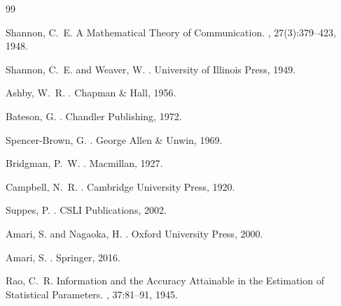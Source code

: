\documentclass[12pt,twoside,openright]{book}
\begin{document}
\backmatter


\begin{thebibliography}{99}


Shannon, C.~E.
\newblock A Mathematical Theory of Communication.
,
  27(3):379--423, 1948.

Shannon, C.~E. and Weaver, W.
.
\newblock University of Illinois Press, 1949.

Ashby, W.~R.
.
\newblock Chapman \& Hall, 1956.

Bateson, G.
.
\newblock Chandler Publishing, 1972.

Spencer-Brown, G.
.
\newblock George Allen \& Unwin, 1969.


Bridgman, P.~W.
.
\newblock Macmillan, 1927.

Campbell, N.~R.
.
\newblock Cambridge University Press, 1920.

Suppes, P.
.
\newblock CSLI Publications, 2002.


Amari, S. and Nagaoka, H.
.
\newblock Oxford University Press, 2000.

Amari, S.
.
\newblock Springer, 2016.

Rao, C.~R.
\newblock Information and the Accuracy Attainable in the Estimation
  of Statistical Parameters.
,
  37:81--91, 1945.


\end{thebibliography}
\end{document}
